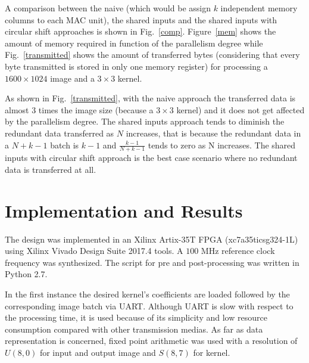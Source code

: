 \documentclass[conference,compsoc]{IEEEtran}
\begin{document}
A comparison between the naive (which would be assign $k$ independent
memory columns to each MAC unit), the shared inputs and the
shared inputs with circular shift approaches is shown in Fig.~\ref{comp}.
Figure~\ref{mem} shows the amount of memory required in function of the
parallelism degree while Fig.~\ref{transmitted} shows the amount of transferred
bytes (considering that every byte transmitted is stored in only one memory
register) for processing a $1600\times1024$ image and a $3\times3$ kernel.

As shown in Fig.~\ref{transmitted}, with the naive approach the transferred data is
almost $3$ times the image size (because a $3\times3$ kernel) and it does not
get affected by the parallelism degree. The shared inputs approach tends to
diminish the redundant data transferred as $N$ increases, that is because the
redundant data in a $N+k-1$ batch is $k-1$ and $\frac{k-1}{N+k-1}$ tends to zero
as N increases. The shared inputs with circular shift approach is the best case
scenario where no redundant data is transferred at all.


\section{Implementation and Results}\label{sec:implementation}
The design was implemented in an Xilinx Artix-35T FPGA (xc7a35ticsg324-1L) using
Xilinx Vivado Design Suite 2017.4 tools. A $100$ MHz reference clock frequency
was synthesized. The script for pre and post-processing was written in Python
2.7.

In the first instance the desired kernel's coefficients are loaded followed by
the corresponding image batch via UART\@. Although UART is slow with respect to
the processing time, it is used because of its simplicity and low resource
consumption compared with other transmission medias.
As far as data representation is concerned, fixed point arithmetic was used with
a resolution of $U(8,0)$ for input and output image and $S(8,7)$ for kernel.
\end{document}
